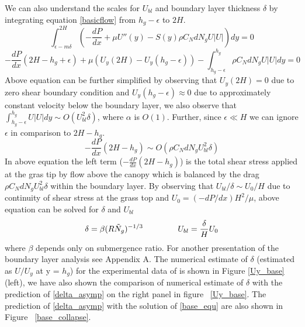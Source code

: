 \documentclass[12pt]{report}   %
\newcommand{\Ndg}{\tilde{N}_g}
\begin{document}
We can also understand the scales for $U_{bl}$ and boundary layer thickness $\delta$ by integrating equation \eqref{basicflow} from $h_g-\epsilon$ to $2H$.
\begin{equation}
 \int_{\epsilon-m\delta}^{2H} \left( -\frac{dP}{dx}+\mu U''(y) -S(y) \rho C_N d N_gU |U|\right)dy = 0 
\end{equation}
\begin{equation*}
-\frac{dP}{dx}(2H-h_g+\epsilon)+\mu (U_y(2H)-U_y(h_g-\epsilon)) -\int_{h_g-\epsilon}^{h_g} \rho C_N d N_gU |U|dy  =0
\end{equation*}
Above equation can be further simplified by observing that $U_y(2H)=0$ due to zero shear boundary condition and $U_y(h_g-\epsilon) \approx 0$ due to approximately constant velocity below the boundary layer, we also observe that $\int_{h_g-\epsilon}^{h_g} U |U| dy \sim O( U_{bl}^2 \delta )$, where $\alpha$ is $O(1)$.
Further, since $\epsilon \ll H$ we can ignore $\epsilon$ in comparison to $2H-h_g$.
\begin{equation}
-\frac{dP}{dx}(2H-h_g) \sim O( \rho C_N d N_g U_{bl}^2  \delta )
\end{equation}
In above equation the left term ($ -\frac{dP}{dx}(2H-h_g)$) is the total shear stress applied at the gras tip by flow above the canopy which is balanced by the drag $\rho C_N d N_g U_{bl}^2 \delta $ within the boundary layer. By observing that $ U_{bl}/\delta \sim U_0/H$ due to continuity of shear stress at the grass top and $U_0 = (-dP/dx) H^2/\mu$, above equation can be solved for $\delta$ and $U_{bl}$
\begin{equation}
 \delta = \beta (R\Ndg)^{-1/3} \hspace{1.5cm} U_{bl} = \frac{\delta}{H} U_0 
 \label{delta_asymp}
\end{equation}
where $\beta$ depends only on submergence ratio. For another presentation of the boundary layer analysis see Appendix A. The numerical estimate of $\delta$ (estimated as $U/U_y$ at y = $h_g$) for the experimental data of \cite{Nepf04} is shown in Figure \ref{Uy_base} (left), we have also shown the comparison of numerical estimate of $\delta$ with the prediction of \eqref{delta_asymp} on the right panel in figure ~\ref{Uy_base}.
The prediction of \eqref{delta_asymp} with the solution of \eqref{base_equ} are also shown in Figure ~\ref{base_collapse}. 
\end{document}
